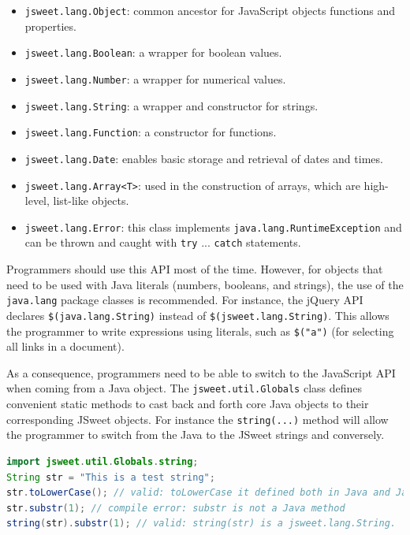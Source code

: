 \documentclass[a4paper]{report}
\begin{document}
\begin{itemize}
\item \texttt{jsweet.lang.Object}: common ancestor for JavaScript objects functions and properties.
\item \texttt{jsweet.lang.Boolean}: a wrapper for boolean values.
\item \texttt{jsweet.lang.Number}: a wrapper for numerical values.
\item \texttt{jsweet.lang.String}: a wrapper and constructor for strings.
\item \texttt{jsweet.lang.Function}: a constructor for functions.
\item \texttt{jsweet.lang.Date}: enables basic storage and retrieval of dates and times.
\item \texttt{jsweet.lang.Array<T>}: used in the construction of arrays, which are high-level, list-like objects.
\item \texttt{jsweet.lang.Error}: this class implements \texttt{java.lang.RuntimeException} and can be thrown and caught with \texttt{try} ... \texttt{catch} statements.
\end{itemize}

Programmers should use this API most of the time. However, for objects that need to be used with Java literals (numbers, booleans, and strings), the use of the \texttt{java.lang} package classes is recommended. For instance, the jQuery API declares \texttt{\$(java.lang.String)} instead of \texttt{\$(jsweet.\-lang.\-String)}. This allows the programmer to write expressions using literals, such as \texttt{\$("a")} (for selecting all links in a document).

As a consequence, programmers need to be able to switch to the JavaScript API when coming from a Java object. The \texttt{jsweet.util.Globals} class defines convenient static methods to cast back and forth core Java objects to their corresponding JSweet objects. For instance the \texttt{string(...)} method will allow the programmer to switch from the Java to the JSweet strings and conversely.

\begin{lstlisting}[language=Java]
import jsweet.util.Globals.string;
String str = "This is a test string";
str.toLowerCase(); // valid: toLowerCase it defined both in Java and JavaScript
str.substr(1); // compile error: substr is not a Java method
string(str).substr(1); // valid: string(str) is a jsweet.lang.String.
\end{lstlisting}
\end{document}
